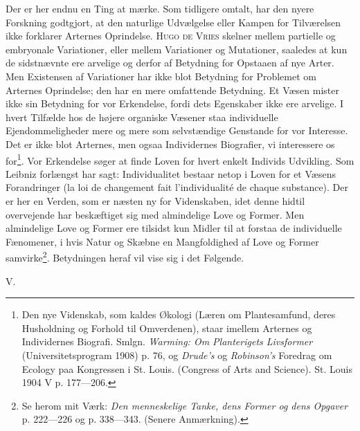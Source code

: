\documentclass[12pt,a4paper,openany]{book}
\newcommand{\opage}[1]{\marginnote{\footnotesize\textit{[#1]}}}
\begin{document}
Der er her endnu en Ting at mærke. Som tidligere omtalt,
har den nyere Forskning godtgjort, at den naturlige Udvælgelse
eller Kampen for Tilværelsen ikke forklarer Arternes
Oprindelse. \textsc{Hugo de Vries} skelner mellem partielle og embryonale
Variationer, eller mellem Variationer og Mutationer,
saaledes at kun de sidstnævnte ere arvelige og derfor af Betydning
for Opstaaen af nye Arter. Men Existensen af Variationer
har ikke blot Betydning for Problemet om Arternes Oprindelse;
den har en mere omfattende Betydning. Et Væsen
\setcounter{footnote}{0}%
\opage{219}mister ikke sin Betydning for vor Erkendelse, fordi dets Egenskaber
ikke ere arvelige. I hvert Tilfælde hos de højere organiske
Væsener staa individuelle Ejendommeligheder mere
og mere som selvstændige Genstande for vor Interesse. Det
er ikke blot Arternes, men ogsaa Individernes Biografier, vi
interessere os for\footnote[1]{Den nye Videnskab, som kaldes Økologi (Læren om Plantesamfund, deres Husholdning og Forhold til Omverdenen), staar imellem Arternes og Individernes Biografi. Smlgn. \textit{Warming: Om Planterigets Livsformer} (Universitetsprogram 1908) p. 76, og \textit{Drude’s} og \textit{Robinson’s} Foredrag om Ecology paa Kongressen i St. Louis. (Congress of Arts and Science). St. Louis 1904 V p. 177---206.}. Vor Erkendelse søger at finde Loven for
hvert enkelt Individs Udvikling. Som Leibniz forlængst har
sagt: Individualitet bestaar netop i Loven for et Væsens Forandringer
(la loi de changement fait l’individualité de chaque
substance). Der er her en Verden, som er næsten ny for
Videnskaben, idet denne hidtil overvejende har beskæftiget sig
med almindelige Love og Former. Men almindelige Love og
Former ere tilsidst kun Midler til at forstaa de individuelle
Fænomener, i hvis Natur og Skæbne en Mangfoldighed af
Love og Former samvirke\footnote[2]{Se herom mit Værk: \textit{Den menneskelige Tanke, dens Former og dens Opgaver} p. 222---226 og p. 338---343. (Senere Anmærkning).}. Betydningen heraf vil vise sig i
det Følgende.

\begin{center}V.\end{center}
\end{document}
